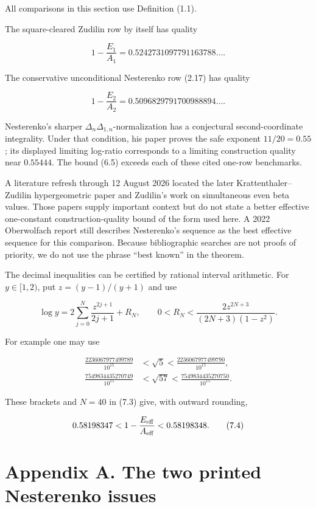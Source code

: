 \documentclass[
  11pt,
]{article}
\begin{document}
All comparisons in this section use Definition (1.1).

The square-cleared Zudilin row by itself has quality

\[
 1-\frac{E_1}{A_1}
 =0.5242731097791163788\ldots.                       \tag{7.1}
\]

The conservative unconditional Nesterenko row (2.17) has quality

\[
 1-\frac{E_2}{A_2}
 =0.5096829791700988894\ldots.                       \tag{7.2}
\]

Nesterenko's sharper \(\Delta_n\Delta_{1,n}\)-normalization has a
conjectural second-coordinate integrality. Under that condition, his
paper proves the safe exponent \(11/20=0.55\); its displayed limiting
log-ratio corresponds to a limiting construction quality near
\(0.55444\). The bound (6.5) exceeds each of these cited one-row
benchmarks.

A literature refresh through 12 August 2026 located the later
Krattenthaler--Zudilin hypergeometric paper and Zudilin's work on
simultaneous even beta values. Those papers supply important context but
do not state a better effective one-constant construction-quality bound
of the form used here. A 2022 Oberwolfach report still describes
Nesterenko's sequence as the best effective sequence for this
comparison. Because bibliographic searches are not proofs of priority,
we do not use the phrase ``best known'' in the theorem.

The decimal inequalities can be certified by rational interval
arithmetic. For \(y\in[1,2)\), put \(z=(y-1)/(y+1)\) and use

\[
 \log y=2\sum_{j=0}^{N}\frac{z^{2j+1}}{2j+1}+R_N,\qquad
 0<R_N<
 \frac{2z^{2N+3}}{(2N+3)(1-z^2)}.                   \tag{7.3}
\]

For example one may use

\[
\begin{aligned}
 \frac{2236067977499789}{10^{15}}&<\sqrt5<
 \frac{2236067977499790}{10^{15}},\\
 \frac{7549834435270749}{10^{15}}&<\sqrt{57}<
 \frac{7549834435270750}{10^{15}}.
\end{aligned}
\]

These brackets and \(N=40\) in (7.3) give, with outward rounding,

\[
 0.58198347<
 1-\frac{E_{\rm eff}}{A_{\rm eff}}
 <0.58198348.                                        \tag{7.4}
\]

\hypertarget{appendix-a.-the-two-printed-nesterenko-issues}{%
\section{Appendix A. The two printed Nesterenko
issues}\label{appendix-a.-the-two-printed-nesterenko-issues}}
\end{document}
